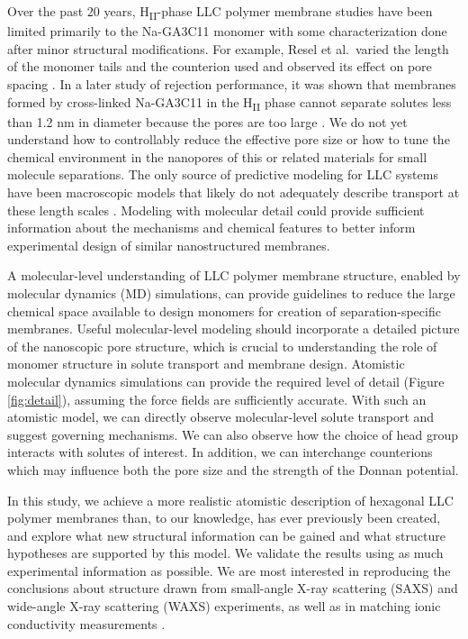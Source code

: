 \documentclass[journal=jpcbfk,manuscript=article]{achemso}
\begin{document}
  Over the past 20 years, H\textsubscript{II}-phase LLC
  polymer membrane studies have been limited primarily to the Na-GA3C11 monomer with some
  characterization done after minor structural modifications. For example, 
  Resel et al.~varied the length of the monomer tails and the counterion used and observed its effect
  on pore spacing \cite{resel_structural_2000}.  In a later study of rejection
  performance, it was shown that membranes formed by cross-linked Na-GA3C11 in
  the H\textsubscript{II} phase cannot separate solutes less than 1.2 nm in
  diameter because the pores are too large \cite{zhou_supported_2005}. We do not
  yet understand how to controllably reduce the effective pore size or how to
  tune the chemical environment in the nanopores of this or related materials for
  small molecule separations. The only source of predictive modeling for LLC
  systems have been macroscopic models that likely do not adequately describe
  transport at these length scales \cite{hatakeyama_water_2011}. Modeling with
  molecular detail could provide sufficient information about the mechanisms and
  chemical features to better inform experimental design of similar
  nanostructured membranes. 

  A molecular-level understanding of LLC polymer membrane structure, enabled by
  molecular dynamics (MD) simulations, can provide guidelines to reduce the large
  chemical space available to design monomers for creation of separation-specific
  membranes. Useful molecular-level modeling should incorporate a detailed picture of the
  nanoscopic pore structure, which is crucial to understanding the role of
  monomer structure in solute transport and membrane design. 
  Atomistic molecular dynamics simulations can provide the required level of detail
  (Figure \ref{fig:detail}), assuming the force fields are sufficiently accurate.
  With such an atomistic model, we can directly observe molecular-level solute
  transport and suggest governing mechanisms. We can also observe how the choice of
  head group interacts with solutes of interest. In addition, we can interchange
  counterions which may influence both the pore size and the strength of the
  Donnan potential. 

  In this study, we achieve a  more realistic atomistic description of hexagonal LLC
  polymer membranes than, to our knowledge, has ever previously been created, and explore
  what new structural information can be gained and what structure hypotheses are
  supported by this model. We validate the results using as much experimental
  information as possible. We are most interested in reproducing the conclusions
  about structure drawn from small-angle X-ray scattering (SAXS) and wide-angle
  X-ray scattering (WAXS) experiments, as well as in matching ionic conductivity
  measurements \cite{feng_thin_2016}.
\end{document}
